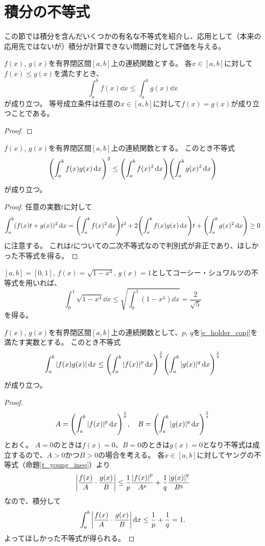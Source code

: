 \section{積分の不等式}

この節では積分を含んだいくつかの有名な不等式を紹介し、応用として（本来の応用先ではないが）積分が計算できない問題に対して評価を与える。

\begin{proposition}[連続関数に対する積分の大小関係]
$f(x)$, $g(x)$を有界閉区間$[a, b]$上の連続関数とする。
各$x \in [a, b]$に対して$f(x) \le g(x)$を満たすとき、
$$
\int_a^b f(x)\dd{x} \le \int_a^b g(x)\dd{x}
$$
が成り立つ。
等号成立条件は任意の$x \in [a, b]$に対して$f(x) = g(x)$が成り立つことである。
\end{proposition}

\begin{proof}
\end{proof}

\begin{theorem}
$f(x)$, $g(x)$を有界閉区間$[a, b]$上の連続関数とする。
このとき不等式
$$
\qty(\int_a^b f(x)g(x)\dd{x})^2 \le \qty(\int_a^b f(x)^2\dd{x})\qty(\int_a^b g(x)^2\dd{x})
$$
が成り立つ。
\end{theorem}

\begin{proof}
任意の実数$t$に対して
$$
\int_a^b (f(x)t+g(x))^2\dd{x} = \qty(\int_a^b f(x)^2\dd{x})t^2+2\qty(\int_a^b f(x)g(x)\dd{x})t+\qty(\int_a^b g(x)^2\dd{x}) \ge 0
$$
に注意する。
これは$t$についての二次不等式なので判別式が非正であり、ほしかった不等式を得る。
\end{proof}

\begin{example}
$[a, b] = [0, 1]$, $f(x) = \sqrt{1-x^4}$, $g(x) = 1$としてコーシー・シュワルツの不等式を用いれば、
$$
\int_0^1 \sqrt{1-x^4}\dd{x} \le \sqrt{\int_0^1 (1-x^4)\dd{x}} = \frac{2}{\sqrt{5}}
$$
を得る。
\end{example}

\begin{theorem}[ヘルダーの不等式]
$f(x)$, $g(x)$を有界閉区間$[a, b]$上の連続関数として、$p$, $q$を\eqref{e_holder_conj}を満たす実数とする。
このとき不等式
$$
\int_a^b |f(x)g(x)|\dd{x} \le \qty(\int_a^b |f(x)|^p\dd{x})^{\frac{1}{p}}\qty(\int_a^b |g(x)|^q\dd{x})^{\frac{1}{q}}
$$
が成り立つ。
\end{theorem}

\begin{proof}
$$
A = \qty(\int_a^b |f(x)|^p\dd{x})^{\frac{1}{p}},
\quad B = \qty(\int_a^b |g(x)|^q\dd{x})^{\frac{1}{q}}
$$
とおく。
$A = 0$のときは$f(x) = 0$、$B = 0$のときは$g(x) = 0$となり不等式は成立するので、$A > 0$かつ$B > 0$の場合を考える。
各$x \in [a, b]$に対してヤングの不等式（命題\ref{t_young_ineq}）より
$$
\abs{\frac{f(x)}{A}\cdot\frac{g(x)}{B}} \le \frac{1}{p}\frac{\abs{f(x)}^p}{A^p}+\frac{1}{q}\frac{\abs{g(x)}^q}{B^q}
$$
なので、積分して
$$
\int_a^b \abs{\frac{f(x)}{A}\cdot\frac{g(x)}{B}}\dd{x} \le \frac{1}{p}+\frac{1}{q} = 1.
$$
よってほしかった不等式が得られる。
\end{proof}

